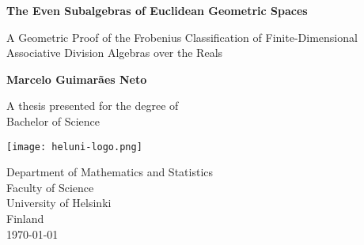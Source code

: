 \begin{titlepage}
    \begin{center}
            
        \Huge
        \textbf{The Even Subalgebras of Euclidean Geometric Spaces}
            
        \vspace{0.5cm}
        \LARGE
		A Geometric Proof of the Frobenius Classification of Finite-Dimensional Associative Division Algebras over the Reals
            
        \vspace{1.5cm}
            
        \textbf{Marcelo Guimarães Neto}
            
        \vfill
            
        A thesis presented for the degree of\\
        Bachelor of Science
            
        \vspace{0.8cm}
            
        \texttt{[image: heluni-logo.png]}
        
        \vspace{0.8cm}
            
        \Large
        Department of Mathematics and Statistics\\
        Faculty of Science\\
        University of Helsinki\\
        Finland\\
        \today
            
    \end{center}
\end{titlepage}
